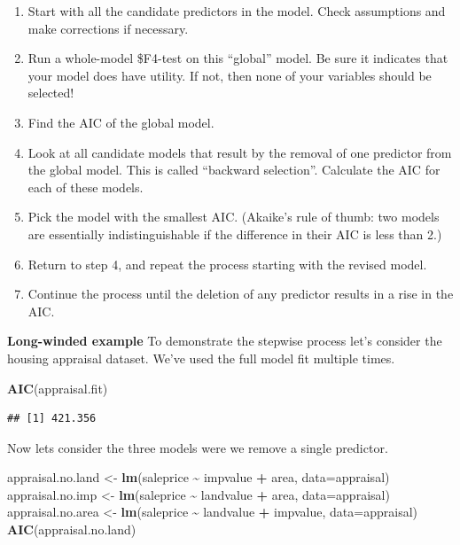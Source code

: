 \documentclass[
]{book}
\newenvironment{Shaded}{\begin{snugshade}}{\end{snugshade}}
\newcommand{\AttributeTok}[1]{\textcolor[rgb]{0.13,0.29,0.53}{#1}}
\newcommand{\FunctionTok}[1]{\textcolor[rgb]{0.13,0.29,0.53}{\textbf{#1}}}
\newcommand{\NormalTok}[1]{#1}
\newcommand{\OtherTok}[1]{\textcolor[rgb]{0.56,0.35,0.01}{#1}}
\newcommand{\SpecialCharTok}[1]{\textcolor[rgb]{0.81,0.36,0.00}{\textbf{#1}}}
\providecommand{\tightlist}{%
  \setlength{\itemsep}{0pt}\setlength{\parskip}{0pt}}
\begin{document}
\begin{enumerate}
\def\labelenumi{\arabic{enumi}.}
\tightlist
\item
  Start with all the candidate predictors in the model. Check assumptions and make corrections if necessary.
\item
  Run a whole-model \$F4-test on this ``global'' model. Be sure it indicates that your model does have utility. If not, then none of your variables should be selected!
\item
  Find the AIC of the global model.
\item
  Look at all candidate models that result by the removal of one predictor from the global model. This is called ``backward selection''. Calculate the AIC for each of these models.
\item
  Pick the model with the smallest AIC. (Akaike's rule of thumb: two models are essentially indistinguishable if the difference in their AIC is less than 2.)
\item
  Return to step 4, and repeat the process starting with the revised model.
\item
  Continue the process until the deletion of any predictor results in a rise in the AIC.
\end{enumerate}

\textbf{Long-winded example} To demonstrate the stepwise process let's consider the housing appraisal dataset. We've used the full model fit multiple times.

\begin{Shaded}
\begin{Highlighting}[]
\FunctionTok{AIC}\NormalTok{(appraisal.fit)}
\end{Highlighting}
\end{Shaded}

\begin{verbatim}
## [1] 421.356
\end{verbatim}

Now lets consider the three models were we remove a single predictor.

\begin{Shaded}
\begin{Highlighting}[]
\NormalTok{appraisal.no.land }\OtherTok{\textless{}{-}} \FunctionTok{lm}\NormalTok{(saleprice }\SpecialCharTok{\textasciitilde{}}\NormalTok{ impvalue }\SpecialCharTok{+}\NormalTok{ area, }\AttributeTok{data=}\NormalTok{appraisal)}
\NormalTok{appraisal.no.imp }\OtherTok{\textless{}{-}} \FunctionTok{lm}\NormalTok{(saleprice }\SpecialCharTok{\textasciitilde{}}\NormalTok{ landvalue }\SpecialCharTok{+}\NormalTok{ area, }\AttributeTok{data=}\NormalTok{appraisal)}
\NormalTok{appraisal.no.area }\OtherTok{\textless{}{-}} \FunctionTok{lm}\NormalTok{(saleprice }\SpecialCharTok{\textasciitilde{}}\NormalTok{ landvalue }\SpecialCharTok{+}\NormalTok{ impvalue, }\AttributeTok{data=}\NormalTok{appraisal)}
\FunctionTok{AIC}\NormalTok{(appraisal.no.land)}
\end{Highlighting}
\end{Shaded}
\end{document}
